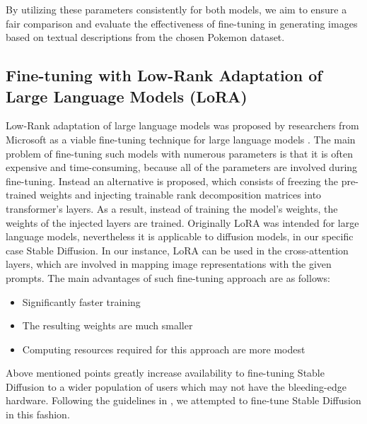 \documentclass[conference]{IEEEtran}
\begin{document}
By utilizing these parameters consistently for both models, we aim to ensure a fair comparison and evaluate the effectiveness of fine-tuning in generating images based on textual descriptions from the chosen Pokemon dataset.

\subsection{Fine-tuning with Low-Rank Adaptation of Large Language Models (LoRA)}
Low-Rank adaptation of large language models was proposed by researchers from Microsoft as a viable fine-tuning technique for large language models \cite{hu2021lora}. The main problem of fine-tuning such models with numerous parameters is that it is often expensive and time-consuming, because all of the parameters are involved during fine-tuning. Instead an alternative is proposed, which consists of freezing the pre-trained weights and injecting trainable rank decomposition matrices into transformer's layers. As a result, instead of training the model's weights, the weights of the injected layers are trained. Originally LoRA was intended for large language models, nevertheless it is applicable to diffusion models, in our specific case Stable Diffusion. In our instance, LoRA can be used in the cross-attention layers, which are involved in mapping image representations with the given prompts. The main advantages of such fine-tuning approach are as follows:
\begin{itemize}
\item Significantly faster training
\item The resulting weights are much smaller
\item Computing resources required for this approach are more modest
\end{itemize}

Above mentioned points greatly increase availability to fine-tuning Stable Diffusion to a wider population of users which may not have the bleeding-edge hardware. Following the guidelines in \cite{lorablog}, we attempted to fine-tune Stable Diffusion in this fashion.



\end{document}
